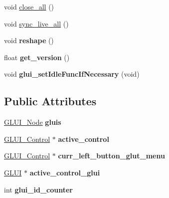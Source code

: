 \begin{DoxyCompactItemize}
\item 
void \hyperlink{classGLUI__Master__Object_ad2f380184ab29c1817f1ad3b25b36fd5}{close\-\_\-all} ()
\item 
void \hyperlink{classGLUI__Master__Object_a6fb29a6080a45d364fc4653591cb1ade}{sync\-\_\-live\-\_\-all} ()
\item 
\hypertarget{classGLUI__Master__Object_a8e092dea6e4ae3a6b52c8cba92eeefb4}{void {\bfseries reshape} ()}\label{classGLUI__Master__Object_a8e092dea6e4ae3a6b52c8cba92eeefb4}

\item 
\hypertarget{classGLUI__Master__Object_ad4654282669300f569d30a4c430f4e6f}{float {\bfseries get\-\_\-version} ()}\label{classGLUI__Master__Object_ad4654282669300f569d30a4c430f4e6f}

\item 
\hypertarget{classGLUI__Master__Object_af9b11cec3c215c6acc1de9bf8e0d92f3}{void {\bfseries glui\-\_\-set\-Idle\-Func\-If\-Necessary} (void)}\label{classGLUI__Master__Object_af9b11cec3c215c6acc1de9bf8e0d92f3}

\end{DoxyCompactItemize}
\subsection*{Public Attributes}
\begin{DoxyCompactItemize}
\item 
\hypertarget{classGLUI__Master__Object_adef972538b4195478dd9feaabd55bd26}{\hyperlink{classGLUI__Node}{G\-L\-U\-I\-\_\-\-Node} {\bfseries gluis}}\label{classGLUI__Master__Object_adef972538b4195478dd9feaabd55bd26}

\item 
\hypertarget{classGLUI__Master__Object_a024c89d0bbae3ea4ebf84af79b093a36}{\hyperlink{classGLUI__Control}{G\-L\-U\-I\-\_\-\-Control} $\ast$ {\bfseries active\-\_\-control}}\label{classGLUI__Master__Object_a024c89d0bbae3ea4ebf84af79b093a36}

\item 
\hypertarget{classGLUI__Master__Object_a0df5b34fced5bb930fb0fe4d982b4e8c}{\hyperlink{classGLUI__Control}{G\-L\-U\-I\-\_\-\-Control} $\ast$ {\bfseries curr\-\_\-left\-\_\-button\-\_\-glut\-\_\-menu}}\label{classGLUI__Master__Object_a0df5b34fced5bb930fb0fe4d982b4e8c}

\item 
\hypertarget{classGLUI__Master__Object_a41b447c76e0a9088aa703593499ff4cb}{\hyperlink{classGLUI}{G\-L\-U\-I} $\ast$ {\bfseries active\-\_\-control\-\_\-glui}}\label{classGLUI__Master__Object_a41b447c76e0a9088aa703593499ff4cb}

\item 
\hypertarget{classGLUI__Master__Object_a9cd3c12203f03cd54115e7852e0d82e3}{int {\bfseries glui\-\_\-id\-\_\-counter}}\label{classGLUI__Master__Object_a9cd3c12203f03cd54115e7852e0d82e3}

\end{DoxyCompactItemize}
